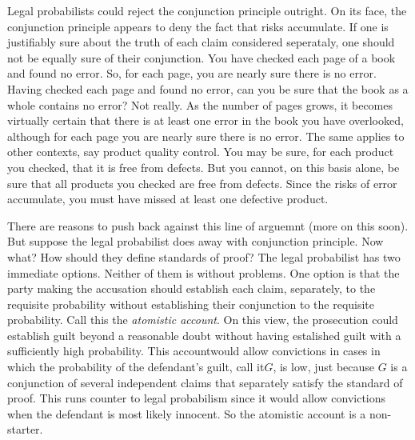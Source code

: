 \documentclass[10pt,dvipsnames,enabledeprecatedfontcommands]{scrartcl}
\begin{document}
Legal probabilists could reject the conjunction principle outright. On
its face, the conjunction principle appears to deny the fact that risks
accumulate. If one is justifiably sure about the truth of each claim
considered seperataly, one should not be equally sure of their
conjunction. You have checked each page of a book and found no error.
So, for each page, you are nearly sure there is no error. Having checked
each page and found no error, can you be sure that the book as a whole
contains no error? Not really. As the number of pages grows, it becomes
virtually certain that there is at least one error in the book you have
overlooked, although for each page you are nearly sure there is no
error. The same applies to other contexts, say product quality control.
You may be sure, for each product you checked, that it is free from
defects. But you cannot, on this basis alone, be sure that all products
you checked are free from defects. Since the risks of error accumulate,
you must have missed at least one defective product.

There are reasons to push back against this line of arguemnt (more on
this soon). But suppose the legal probabilist does away with conjunction
principle. Now what? How should they define standards of proof? The
legal probabilist has two immediate options. Neither of them is without
problems. One option is that the party making the accusation should
establish each claim, separately, to the requisite probability without
establishing their conjunction to the requisite probability. Call this
the \textit{atomistic account}. On this view, the prosecution could
establish guilt beyond a reasonable doubt without having estalished
guilt with a sufficiently high probability. This accountwould allow
convictions in cases in which the probability of the defendant's guilt,
call it\(G\), is low, just because \(G\) is a conjunction of several
independent claims that separately satisfy the standard of proof. This
runs counter to legal probabilism since it would allow convictions when
the defendant is most likely innocent. So the atomistic account is a
non-starter.
\end{document}
